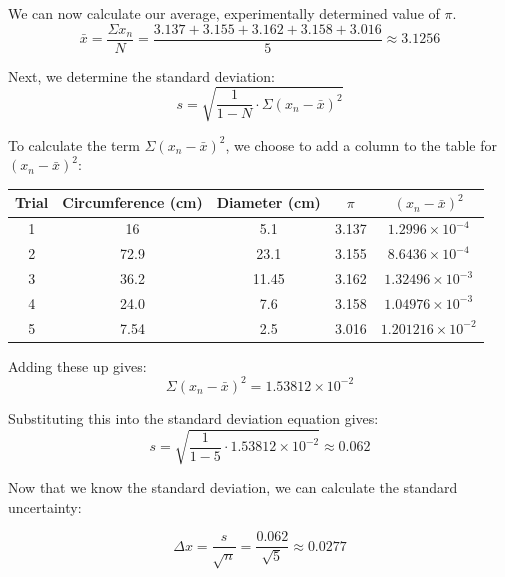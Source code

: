 \begin{mdframed}[backgroundcolor=blue!10!white]
		
		We can now calculate our average, experimentally determined value of $\pi$.
		\begin{equation*}
			\bar{x} = \frac{\Sigma x_n}{N} = \frac{3.137 + 3.155 + 3.162 + 3.158 + 3.016}{5} \approx \boxed{3.1256}
		\end{equation*}
		
		
		Next, we determine the standard deviation:
			\begin{equation*}
			s = \sqrt{\frac{1}{1-N} \cdot \Sigma (x_n - \bar{x})^2} 
		\end{equation*}
	
	To calculate the term $\Sigma (x_n - \bar{x})^2$, we choose to add a column to the table for $(x_n - \bar{x})^2$:
	
			\begin{center}
		
		
		\begin{tabular}{|c|c|c|c|c|}
			\hline
			Trial & Circumference (cm) & Diameter (cm) &$\pi$ & \color{blue} $(x_n-\bar{x})^2$ \color{black}\\
			\hline
			1 & 16 & 5.1 &3.137 &\color{blue} $1.2996 \times 10^{-4}$ \color{black} \\
			\hline
			2 & 72.9 & 23.1 & 3.155 &\color{blue} $8.6436 \times 10^{-4}$ \color{black} \\
			\hline
			3 & 36.2 & 11.45 & 3.162 &\color{blue} $1.32496 \times 10^{-3}$ \color{black} \\
			\hline 
			4 & 24.0 & 7.6 & 3.158 &\color{blue} $1.04976 \times 10^{-3}$  \color{black} \\
			\hline
			5 & 7.54 & 2.5 & 3.016 &\color{blue} $ 1.201216 \times 10^{-2}$ \color{black} \\
			\hline
		\end{tabular}
	\end{center}	

Adding these up gives: 
\begin{equation*}
	\Sigma (x_n - \bar{x})^2 = 1.53812 \times 10^{-2}
\end{equation*}

Substituting this into the standard deviation equation gives: 
	\begin{equation*}
	s = \sqrt{\frac{1}{1-5} \cdot 1.53812 \times 10^{-2}} \approx \boxed{0.062}
\end{equation*}

Now that we know the standard deviation, we can calculate the standard uncertainty:

\begin{equation*}
	\Delta x  = \frac{s}{\sqrt{n}} = \frac{0.062}{\sqrt{5}} \approx \boxed {0.0277}
\end{equation*}


\end{mdframed}
